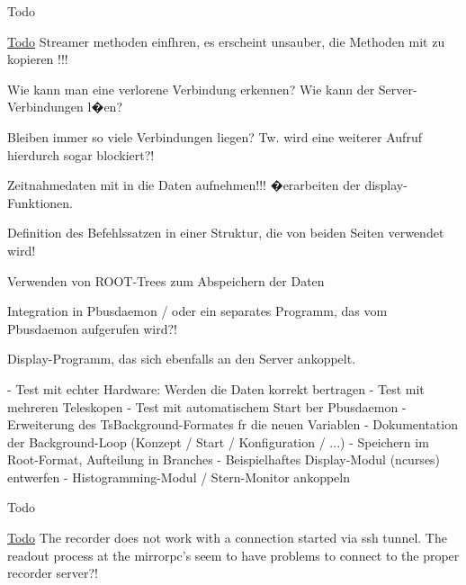 \begin{DoxyRefDesc}{Todo}
\item[\hyperlink{todo__todo000013}{Todo}]Streamer methoden einfhren, es erscheint unsauber, die Methoden mit zu kopieren !!! 

Wie kann man eine verlorene Verbindung erkennen? Wie kann der Server-\/\-Verbindungen l�en?
\begin{DoxyItemize}
\item Bleiben immer so viele Verbindungen liegen? Tw. wird eine weiterer Aufruf hierdurch sogar blockiert?!
\item Zeitnahmedaten mit in die Daten aufnehmen!!! �erarbeiten der display-\/\-Funktionen.
\item Definition des Befehlssatzen in einer Struktur, die von beiden Seiten verwendet wird!
\item Verwenden von R\-O\-O\-T-\/\-Trees zum Abspeichern der Daten
\item Integration in Pbusdaemon / oder ein separates Programm, das vom Pbusdaemon aufgerufen wird?!
\item Display-\/\-Programm, das sich ebenfalls an den Server ankoppelt.
\end{DoxyItemize}\end{DoxyRefDesc}
\begin{DoxyVerb}- Test mit echter Hardware: Werden die Daten korrekt bertragen
- Test mit mehreren Teleskopen
- Test mit automatischem Start ber Pbusdaemon
- Erweiterung des TsBackground-Formates fr die neuen Variablen
- Dokumentation der Background-Loop (Konzept / Start / Konfiguration / ...)
- Speichern im Root-Format, Aufteilung in Branches
- Beispielhaftes Display-Modul (ncurses) entwerfen
- Histogramming-Modul / Stern-Monitor ankoppeln
\end{DoxyVerb}


\begin{DoxyRefDesc}{Todo}
\item[\hyperlink{todo__todo000014}{Todo}]The recorder does not work with a connection started via ssh tunnel. The readout process at the mirrorpc's seem to have problems to connect to the proper recorder server?!\end{DoxyRefDesc}


